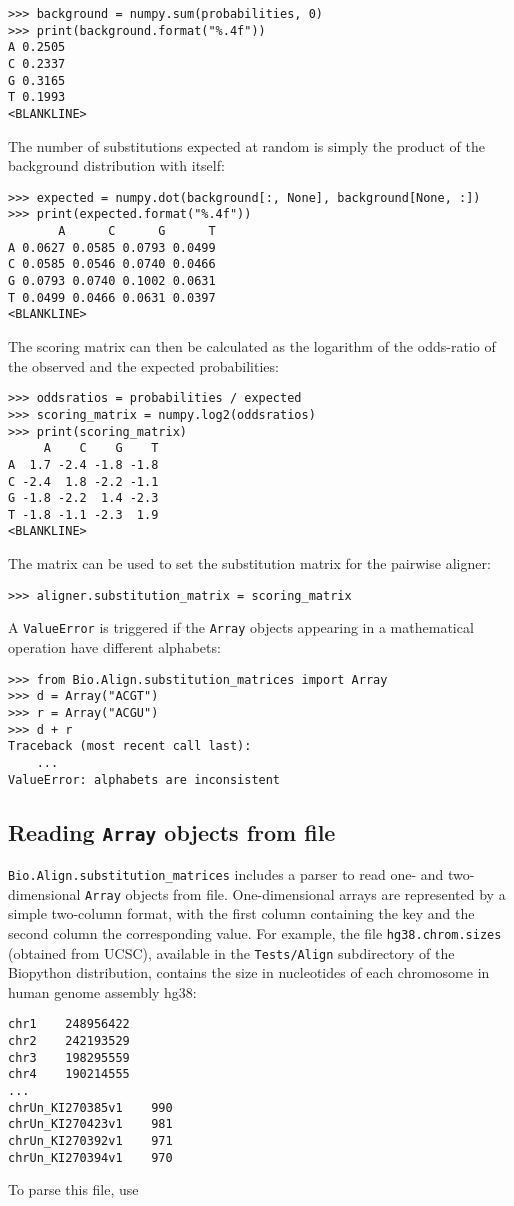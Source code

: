 \begin{verbatim}
>>> background = numpy.sum(probabilities, 0)
>>> print(background.format("%.4f"))
A 0.2505
C 0.2337
G 0.3165
T 0.1993
<BLANKLINE>
\end{verbatim}
The number of substitutions expected at random is simply the product of the background distribution with itself:

\begin{verbatim}
>>> expected = numpy.dot(background[:, None], background[None, :])
>>> print(expected.format("%.4f"))
       A      C      G      T
A 0.0627 0.0585 0.0793 0.0499
C 0.0585 0.0546 0.0740 0.0466
G 0.0793 0.0740 0.1002 0.0631
T 0.0499 0.0466 0.0631 0.0397
<BLANKLINE>
\end{verbatim}
The scoring matrix can then be calculated as the logarithm of the odds-ratio of the observed and the expected probabilities:

\begin{verbatim}
>>> oddsratios = probabilities / expected
>>> scoring_matrix = numpy.log2(oddsratios)
>>> print(scoring_matrix)
     A    C    G    T
A  1.7 -2.4 -1.8 -1.8
C -2.4  1.8 -2.2 -1.1
G -1.8 -2.2  1.4 -2.3
T -1.8 -1.1 -2.3  1.9
<BLANKLINE>
\end{verbatim}
The matrix can be used to set the substitution matrix for the pairwise aligner:

\begin{verbatim}
>>> aligner.substitution_matrix = scoring_matrix
\end{verbatim}

A \verb+ValueError+ is triggered if the \verb+Array+ objects appearing in a mathematical operation have different alphabets:

\begin{verbatim}
>>> from Bio.Align.substitution_matrices import Array
>>> d = Array("ACGT")
>>> r = Array("ACGU")
>>> d + r
Traceback (most recent call last):
    ...
ValueError: alphabets are inconsistent
\end{verbatim}

\subsection{Reading \texttt{Array} objects from file}

\verb+Bio.Align.substitution_matrices+ includes a parser to read one- and two-dimensional \verb+Array+ objects from file. One-dimensional arrays are represented by a simple two-column format, with the first column containing the key and the second column the corresponding value. For example, the file \verb+hg38.chrom.sizes+ (obtained from UCSC), available in the \verb+Tests/Align+ subdirectory of the Biopython distribution, contains the size in nucleotides of each chromosome in human genome assembly hg38:
\begin{verbatim}
chr1    248956422
chr2    242193529
chr3    198295559
chr4    190214555
...
chrUn_KI270385v1    990
chrUn_KI270423v1    981
chrUn_KI270392v1    971
chrUn_KI270394v1    970
\end{verbatim}
To parse this file, use

